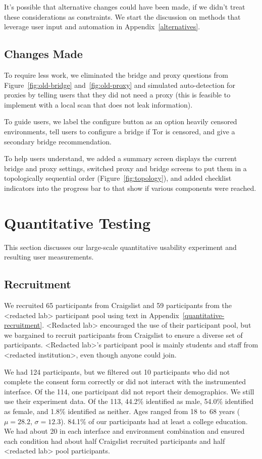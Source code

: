 \documentclass[USenglish,oneside,twocolumn]{article}
\begin{document}
It's possible that alternative changes could have been made, if we didn't treat these considerations as constraints. We start the discussion on methods that leverage user input and automation in Appendix~\ref{alternatives}. 

\subsection{Changes Made} 
To require less work, we eliminated the bridge and proxy questions from Figure~\ref{fig:old-bridge} and~\ref{fig:old-proxy} and simulated auto-detection for proxies by telling users that they did not need a proxy (this is feasible to implement with a local scan that does not leak information). 

To guide users, we label the configure button as an option heavily censored environments, tell users to configure a bridge if Tor is censored, and give a secondary bridge recommendation.

To help users understand, we added a summary screen displays the current bridge and proxy settings, switched proxy and bridge screens to put them in a topologically sequential order (Figure~\ref{fig:topology}), and added checklist indicators into the progress bar to that show if various components were reached.

\section{Quantitative Testing}
\label{sec:quantitative}
This section discusses our large-scale quantitative usability experiment and resulting user measurements. 

\subsection{Recruitment}
We recruited 65 participants from Craigslist and 59 participants from the <redacted lab> participant pool using text in Appendix~\ref{quantitative-recruitment}. <Redacted lab> encouraged the use of their participant pool, but we bargained to recruit participants from Craigslist to ensure a diverse set of participants. <Redacted lab>'s participant pool is mainly students and staff from <redacted institution>, even though anyone could join. 

We had 124 participants, but we filtered out 10 participants who did not complete the consent form correctly or did not interact with the instrumented interface. Of the 114, one participant did not report their demographics. We still use their experiment data. Of the 113, 44.2\% identified as male, 54.0\% identified as female, and 1.8\% identified as neither. Ages ranged from 18 to~68 years ($\mu = 28.2$, $\sigma = 12.3$). 84.1\% of our participants had at least a college education. We had about 20 in each interface and environment combination and ensured each condition had about half Craigslist recruited participants and half <redacted lab>  pool participants. 
\end{document}
